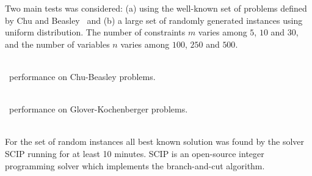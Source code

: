 Two main tests was considered:
(a) using the well-known set of problems defined by Chu and Beasley~\cite{Chu-Beasley-1998}
and (b) a large set of randomly generated instances using uniform distribution.
The number of constraints $m$ varies among $5$, $10$ and $30$, and the number
of variables $n$ varies among $100$, $250$ and $500$.
\\[2mm]
\begin{minipage}[c]{0.4\linewidth}
  \begin{center}
    
        \\[2mm]
        \scecore~performance on Chu-Beasley problems.
  \end{center}
\end{minipage}
\begin{minipage}[c]{0.6\linewidth}
  \begin{center}
    
        \\[2mm]
        \scecore~performance on Glover-Kochenberger problems.
  \end{center}
\end{minipage}
\\[2mm]
For the set of random instances all best known solution was found by the solver
SCIP running for at least 10 minutes.
SCIP is an open-source integer programming solver which
implements the branch-and-cut algorithm.
